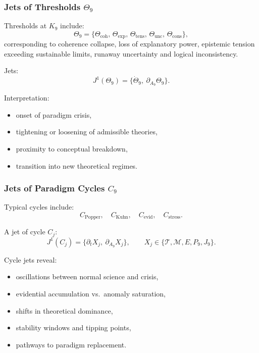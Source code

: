\subsubsection{Jets of Thresholds \texorpdfstring{$\Theta_9$}{\Theta_9}}

Thresholds at $K_9$ include:
\[
\Theta_9 =
\{
\Theta_{\mathrm{coh}},\,
\Theta_{\mathrm{exp}},\,
\Theta_{\mathrm{tens}},\,
\Theta_{\mathrm{unc}},\,
\Theta_{\mathrm{cons}}
\},
\]
corresponding to coherence collapse, loss of explanatory power,
epistemic tension exceeding sustainable limits, runaway uncertainty and
logical inconsistency.

Jets:
\[
J^1(\Theta_9)=\{\dot{\Theta}_9,\ \partial_{A_9}\Theta_9\}.
\]

Interpretation:
\begin{itemize}
    \item onset of paradigm crisis,
    \item tightening or loosening of admissible theories,
    \item proximity to conceptual breakdown,
    \item transition into new theoretical regimes.
\end{itemize}


\subsubsection{Jets of Paradigm Cycles \texorpdfstring{$C_9$}{C_9}}

Typical cycles include:
\[
C_{\mathrm{Popper}},\quad
C_{\mathrm{Kuhn}},\quad
C_{\mathrm{evid}},\quad
C_{\mathrm{stress}}.
\]

A jet of cycle $C_j$:
\[
J^1(C_j)
=
\{\partial_t X_j,\ \partial_{A_9}X_j\},
\qquad
X_j\in
\{\mathcal{T},\mathcal{M},E,P_9,J_9\}.
\]

Cycle jets reveal:
\begin{itemize}
    \item oscillations between normal science and crisis,
    \item evidential accumulation vs.\ anomaly saturation,
    \item shifts in theoretical dominance,
    \item stability windows and tipping points,
    \item pathways to paradigm replacement.
\end{itemize}


